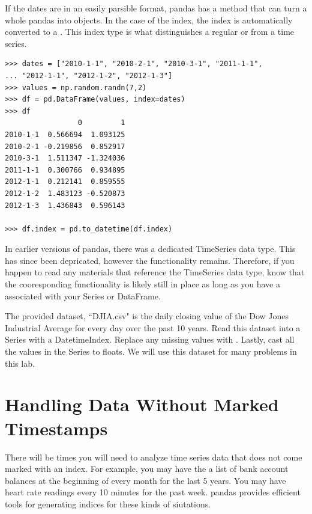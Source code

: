 If the dates are in an easily parsible format, pandas has a method  that can turn a whole pandas  into  objects. In the case of the index, the index is automatically converted to a . This index type is what distinguishes a regular  or  from a time series.

\begin{lstlisting}
>>> dates = ["2010-1-1", "2010-2-1", "2010-3-1", "2011-1-1",
... "2012-1-1", "2012-1-2", "2012-1-3"]
>>> values = np.random.randn(7,2)
>>> df = pd.DataFrame(values, index=dates)
>>> df
                 0         1
2010-1-1  0.566694  1.093125
2010-2-1 -0.219856  0.852917
2010-3-1  1.511347 -1.324036
2011-1-1  0.300766  0.934895
2012-1-1  0.212141  0.859555
2012-1-2  1.483123 -0.520873
2012-1-3  1.436843  0.596143

>>> df.index = pd.to_datetime(df.index)
\end{lstlisting}

\begin{info}
In earlier versions of pandas, there was a dedicated TimeSeries data type. This has since been depricated, however the functionality remains. Therefore, if you happen to read any materials that reference the TimeSeries data type, know that the cooresponding functionality is likely still in place as long as you have a  associated with your Series or DataFrame.
\end{info}

\begin{problem} \label{prob:DJIA}
The provided dataset, ``DJIA.csv" is the daily closing value of the Dow Jones Industrial Average for every day over the past 10 years. Read this dataset into a Series with a DatetimeIndex. Replace any missing values with . Lastly, cast all the values in the Series to floats. We will use this dataset for many problems in this lab.
\end{problem}

\section*{Handling Data Without Marked Timestamps}

There will be times you will need to analyze time series data that does not come marked with an index. For example, you may have the a list of bank account balances at the beginning of every month for the last 5 years. You may have heart rate readings every 10 minutes for the past week. pandas provides efficient tools for generating indices for these kinds of siutations.

